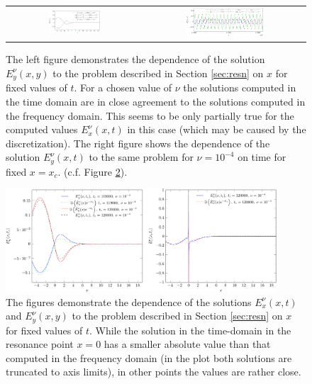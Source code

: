 \begin{figure}
\begin{tabular}{cc}
\includegraphics[width=0.4\textwidth]{pics_time_domain/res/ey_fixed_t_1e3-crop.pdf}&
\includegraphics[width=0.5\textwidth]{pics_time_domain/res/ey_fixed_x_nu1e4-crop.pdf}
\end{tabular}
\caption{The left figure demonstrates the dependence of the solution  
$E_y^{\nu}(x,y)$ to the problem described in Section \ref{sec:resn} on $x$ for fixed values of $t$. 
For a chosen value of $\nu$ the solutions computed in the time domain are in close agreement 
to the solutions computed in the frequency domain. This seems to be only partially 
true for the computed values $E_x^{\nu}(x,t)$ in this case (which may be caused by the discretization). 
The right figure shows the dependence of the solution $E_y^{\nu}(x,t)$ to the same problem for $\nu=10^{-4}$ on time for fixed $x=x_c$. 
 (c.f. Figure \ref{fig:resonance_nus_eyx_t}). 
}
\label{fig:resonance_nus_ey_t}
\end{figure}

\begin{figure}
\includegraphics[width=0.9\textwidth]{pics_time_domain/res/ex_fixed_t_1e4_2-crop.pdf}
\caption{The figures demonstrate the dependence of the solutions 
$E_x^{\nu}(x,t)$ and $E_y^{\nu}(x,y)$ to the problem described in Section \ref{sec:resn} on $x$ for fixed values of $t$. While the solution in the time-domain 
in the resonance point $x=0$ has a smaller absolute value than that computed in the frequency domain (in the plot both solutions are truncated to 
axis limits), in other points the values are rather close. }
\label{fig:resonance_nus_eyx_t}
\end{figure}

